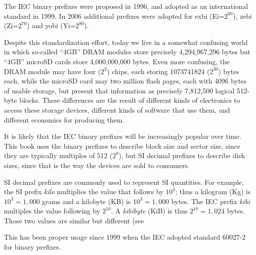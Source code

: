 The IEC binary prefixes were proposed in 1996\cite{iec:1996}, and
adopted as an international standard in 1999.  In 2006 additional
prefixes were adopted for exbi (Ei=$2^{60}$), zebi (Zi=$2^{70}$) and
yobi (Yi=$2^{80}$)\cite{iec:80000-13:2008}.

Despite this standardization effort, today we live in a somewhat
confusing world in which so-called ``4GB'' DRAM modules 
store precisely 4,294,967,296 bytes
but ``4GB'' microSD cards store 4,000,000,000 bytes. Even more confusing, the DRAM
module may have four ($2^{2}$) chips, each storing 1073741824
($2^{30}$) bytes each, while the microSD card may two million flash
pages, each with 4096 bytes of usable storage, but present that
information as precisely 7,812,500 logical 512-byte blocks.  These
differences are the result of different kinds of electronics to access
these storage devices, different kinds of software that use them, and
different economics for producing them. 

It is likely that the IEC binary prefixes will be increasingly popular
over time. This book uses the binary prefixes to describe block size
and sector size, since they are typically multiples of 512 ($2^9$),
but SI decimal prefixes to describe disk sizes, since that is the way
the devices are sold to consumers.

SI decimal prefixes are commonly used to represent SI
quantities. For example, the SI prefix \emph{kilo} multiplies the value that follows by
$10^3$; thus a kilogram (Kg) is
$10^3=1,000$ grams and a kilobyte (KB) is
$10^3=1,000$ bytes. The IEC prefix \emph{kibi} multiples the value following by $2^{10}$. A \emph{kibibyte}
(KiB) is thus $2^{10}=1,024$ bytes. Those two values are similar but
different (see 

This has been proper usage
since 1999 when the IEC adopted standard 60027-2 for binary prefixes.



\newcommand{\WZ}{{\color{white}0}}

